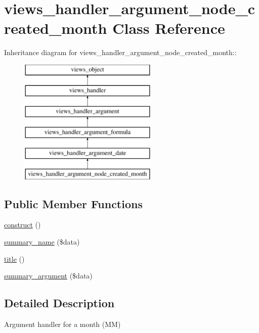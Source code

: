 \hypertarget{classviews__handler__argument__node__created__month}{
\section{views\_\-handler\_\-argument\_\-node\_\-created\_\-month Class Reference}
\label{classviews__handler__argument__node__created__month}
}
Inheritance diagram for views\_\-handler\_\-argument\_\-node\_\-created\_\-month::\begin{figure}[H]
\begin{center}
\leavevmode
\includegraphics[height=6cm]{classviews__handler__argument__node__created__month}
\end{center}
\end{figure}
\subsection*{Public Member Functions}
\begin{CompactItemize}
\item 
\hyperlink{classviews__handler__argument__node__created__month_0f9b4da1f37a58ca3e416667dc8d9bbb}{construct} ()
\item 
\hyperlink{classviews__handler__argument__node__created__month_1376f79ca0408659bea06caa51ce6da6}{summary\_\-name} (\$data)
\item 
\hyperlink{classviews__handler__argument__node__created__month_3dbf8aaf46f210de7c29c36abfb7a2d6}{title} ()
\item 
\hyperlink{classviews__handler__argument__node__created__month_4ecc9b35ee8ae4e8d61d18e83f1dfe82}{summary\_\-argument} (\$data)
\end{CompactItemize}


\subsection{Detailed Description}
Argument handler for a month (MM) 

